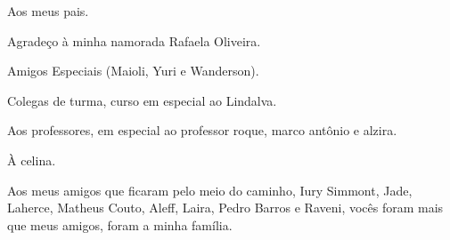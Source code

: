 \begin{agradecimentos}

  Aos meus pais. 

  Agradeço à minha namorada Rafaela Oliveira.

  Amigos Especiais (Maioli, Yuri e Wanderson).

  Colegas de turma, curso em especial ao Lindalva.

  Aos professores, em especial ao professor roque, marco antônio e alzira.

  À celina.

  Aos meus amigos que ficaram pelo meio do caminho, Iury Simmont, Jade, Laherce, Matheus Couto, Aleff, Laira, Pedro Barros e Raveni, vocês foram mais que meus amigos, foram a minha família. 
\end{agradecimentos}
